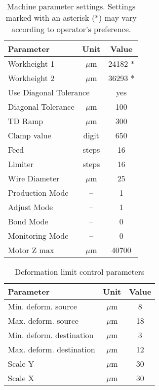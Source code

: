 \documentclass[12pt]{unlsilabsop}
\begin{document}
\begin{table*}[hH]
\begin{center}
\caption{Machine parameter settings. Settings marked with an asterisk (*) may vary according to operator's preference.}
\label{tbl:otherpar}

\bigskip

\begin{tabular}{lcc}
\toprule
Parameter          & Unit   & Value \\
\midrule
Workheight 1       & $\mu$m & 24182 *\\
Workheight 2       & $\mu$m & 36293 * \\
\multicolumn{2}{l}{Use Diagonal Tolerance} & yes \\
Diagonal Tolerance & $\mu$m & 100 \\
TD Ramp            & $\mu$m & 300 \\
Clamp value        & digit  & 650 \\
Feed               & steps  & 16 \\
Limiter            & steps  & 16 \\
Wire Diameter      & $\mu$m & 25 \\
Production Mode    & --     & 1 \\
Adjust Mode        & --     & 1 \\
Bond Mode          & --     & 0 \\
Monitoring Mode    & --     & 0 \\
\midrule
Motor Z max        & $\mu$m & 40700 \\
\midrule
    \bottomrule
\end{tabular}
\end{center}
\end{table*}

\begin{table*}[hH]
\begin{center}
\caption{Deformation limit control parameters}
\label{tbl:DLCpar}

\bigskip

\begin{tabular}{lcc}
\toprule
Parameter                & Unit   & Value \\
\midrule
Min. deform. source      & $\mu$m &  8 \\
Max. deform. source      & $\mu$m & 18 \\
Min. deform. destination & $\mu$m &  3 \\
Max. deform. destination & $\mu$m & 12 \\
Scale Y                  & $\mu$m & 30 \\
Scale X                  & $\mu$m & 30 \\
    \bottomrule
\end{tabular}
\end{center}
\end{table*}
\end{document}
